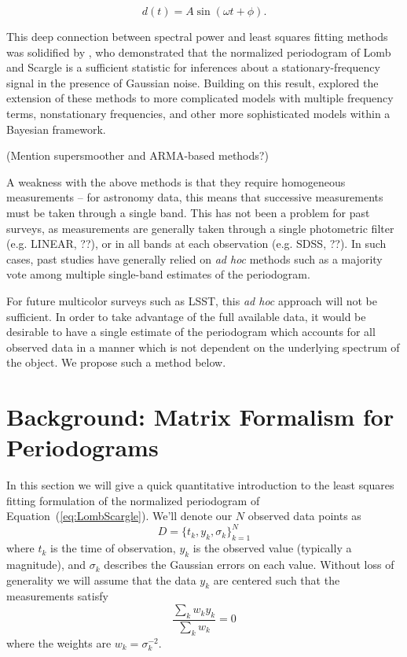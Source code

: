 \documentclass[12pt,preprint]{aastex}
\newcommand{\foreign}[1]{{\it #1}}
\newcommand{\adhoc}{\foreign{ad hoc}}
\newcommand{\Eq}[1]{Equation~(\ref{eq:#1})}
\newcommand{\eq}[1]{\Eq{#1}}
\newcommand{\eqlabel}[1]{\label{eq:#1}}
\begin{document}
\begin{equation}
  \eqlabel{SingleModel}
  d(t) = A\sin(\omega t + \phi).
\end{equation}

This deep connection between spectral power and least squares fitting methods was solidified by \citep{Jaynes87}, who demonstrated that the normalized periodogram of Lomb and Scargle is a sufficient statistic for inferences about a stationary-frequency signal in the presence of Gaussian noise. Building on this result, \citep{Bretthorst88} explored the extension of these methods to more complicated models with multiple frequency terms, nonstationary frequencies, and other more sophisticated models within a Bayesian framework.

(Mention supersmoother and ARMA-based methods?)

A weakness with the above methods is that they require homogeneous measurements -- for astronomy data, this means that successive measurements must be taken through a single band. This has not been a problem for past surveys, as measurements are generally taken through a single photometric filter (e.g. LINEAR, ??), or in all bands at each observation (e.g. SDSS, ??). In such cases, past studies have generally relied on \adhoc{} methods such as a majority vote among multiple single-band estimates of the periodogram.

For future multicolor surveys such as LSST, this \adhoc{} approach will not be sufficient. In order to take advantage of the full available data, it would be desirable to have a single estimate of the periodogram which accounts for all observed data in a manner which is not dependent on the underlying spectrum of the object. We propose such a method below.


\section{Background: Matrix Formalism for Periodograms}

In this section we will give a quick quantitative introduction to the least squares fitting formulation of the normalized periodogram of \eq{LombScargle}. We'll denote our $N$ observed data points as
\begin{equation}
  D = \{t_k, y_k, \sigma_k\}_{k=1}^N
\end{equation}
where $t_k$ is the time of observation, $y_k$ is the observed value (typically a magnitude), and $\sigma_k$ describes the Gaussian errors on each value. Without loss of generality we will assume that the data $y_k$ are centered such that the measurements satisfy
\begin{equation}
  \eqlabel{ycentered}
  \frac{\sum_k w_ky_k}{\sum_k w_k} = 0
\end{equation}
where the weights are $w_k = \sigma_k^{-2}$.
\end{document}
